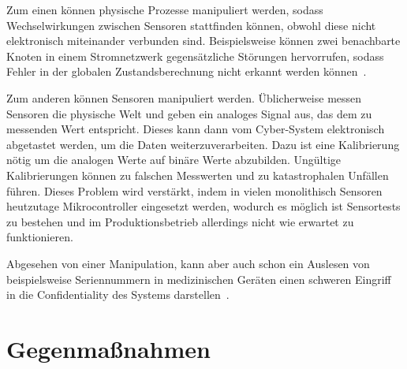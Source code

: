 \documentclass[final,bibliography=totocnumbered]{include/sikseminar}
\newcommand{\cps}{\glspl{cps}\xspace}
\begin{document}
    Zum einen können physische Prozesse manipuliert werden, sodass Wechselwirkungen zwischen Sensoren stattfinden können, obwohl diese nicht elektronisch miteinander verbunden sind.
    Beispielsweise können zwei benachbarte Knoten in einem Stromnetzwerk gegensätzliche Störungen hervorrufen, sodass Fehler in der globalen Zustandsberechnung nicht erkannt werden können~\cite{KLG15}.

    Zum anderen können Sensoren manipuliert werden.
    Üblicherweise messen Sensoren die physische Welt und geben ein analoges Signal aus, das dem zu messenden Wert entspricht.
    Dieses kann dann vom Cyber-System elektronisch abgetastet werden, um die Daten weiterzuverarbeiten.
    Dazu ist eine Kalibrierung nötig um die analogen Werte auf binäre Werte abzubilden.
    Ungültige Kalibrierungen können zu falschen Messwerten und zu katastrophalen Unfällen führen.
    Dieses Problem wird verstärkt, indem in vielen monolithisch Sensoren heutzutage Mikrocontroller eingesetzt werden, wodurch es möglich ist Sensortests zu bestehen und im Produktionsbetrieb allerdings nicht wie erwartet zu funktionieren.~\cite{KLG15}

    Abgesehen von einer Manipulation, kann aber auch schon ein Auslesen von beispielsweise Seriennummern in medizinischen Geräten einen schweren Eingriff in die Confidentiality des Systems darstellen~\cite{HLL+17}.



    \section{Gegenmaßnahmen}\label{sec:gegenmassnahmen}
\end{document}
